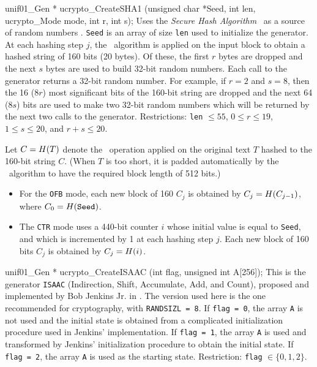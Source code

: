 unif01_Gen * ucrypto_CreateSHA1 (unsigned char *Seed, int len,
                                 ucrypto_Mode mode, int r, int s);
\endcode
 \tab Uses the \textit{Secure Hash Algorithm}
  \shaun\ as a source of random numbers \cite{rNIS02a,rBAR06a}.
% 
 \texttt{Seed} is an array of size \texttt{len} used to initialize the
  generator. At each hashing step $j$, the \shaun\ algorithm is applied on the
  input block to obtain a hashed string of 160 bits (20 bytes). Of these,
  the first $r$ bytes are dropped and the next $s$ bytes are used to build 32-bit
  random numbers. Each call to the generator returns a 32-bit random number.
  For example, if $r=2$ and $s=8$, then the 16 ($8r$) most significant bits of
  the 160-bit string are dropped and the next 64 ($8s$) bits are used to make
  two 32-bit random numbers which will be returned by the next two
  calls to the generator. Restrictions: \texttt{len} $\le 55$,
  $0 \le r \le 19$, $1 \le s \le 20$, and  $r + s \le 20$.

 Let $C = {H}(T)$ denote the \shaun\  operation applied on the original text $T$ 
 hashed to the 160-bit string $C$. (When $T$ is too short, it is padded
 automatically by the \shaun\  algorithm to have the required block length of 
 512 bits.)
\begin{itemize}
\item  For the \texttt{OFB} mode, each new block of 160 $C_j$ is
  obtained by $C_j = {H}(C_{j-1})$, where $C_0 = {H}(\mbox{\texttt{Seed}})$.

\item The \texttt{CTR} mode uses a 440-bit counter $i$ whose initial value is
  equal to \texttt{Seed}, and which is incremented by 1 at each hashing step $j$.
  Each new block of 160 bits $C_j$ is obtained by
  $C_j = {H}(i)$.
\end{itemize}
 \endtab
\code


unif01_Gen * ucrypto_CreateISAAC (int flag, unsigned int A[256]);
\endcode
  \tab 
   This is the generator \texttt{ISAAC}
%
   (Indirection, Shift, Accumulate, Add, and Count),
   proposed and implemented by Bob Jenkins Jr. in \cite{rJEN96a}.
   The version used here is the one recommended for cryptography,
   with  \texttt{RANDSIZL = 8}.
   If \texttt{flag = 0}, the array  \texttt{A} is not used and the initial state
   is obtained from a complicated initialization procedure used in Jenkins' 
   implementation. 
   If \texttt{flag = 1}, the array \texttt{A} is used and transformed by
   Jenkins' initialization procedure to obtain the initial state.
   If \texttt{flag = 2}, the array  \texttt{A} is used as the starting
   state.  Restriction: \texttt{flag} $\in \{0, 1, 2\}$.
 \endtab


